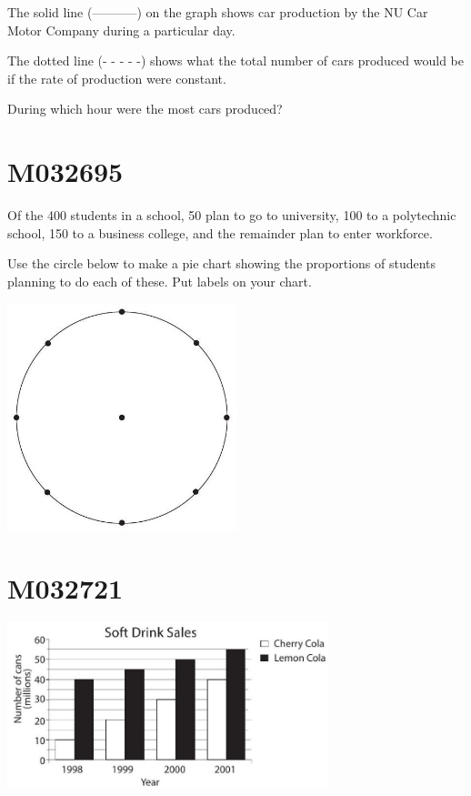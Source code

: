 \documentclass[12pt]{article}
\begin{document}
The solid line (-----------) on the graph shows car production by the NU Car Motor Company during a particular day.

The dotted line (- - - - -) shows what the total number of cars produced would be if the rate of production were constant.

During which hour were the most cars produced?


\newpage
\section*{M032695}

Of the 400 students in a school, 50 plan to go to university, 100 to a polytechnic school, 150 to a business college, and the remainder plan to enter workforce.

Use the circle below to make a pie chart showing the proportions of students planning to do each of these. Put labels on your chart.

\includegraphics[max width=0.5\textwidth]{2024_02_20_828ebc9d68bcc1fbb223g-76}

\newpage
\section*{M032721}

\includegraphics[max width=0.7\textwidth]{2024_02_20_828ebc9d68bcc1fbb223g-77}
\end{document}
